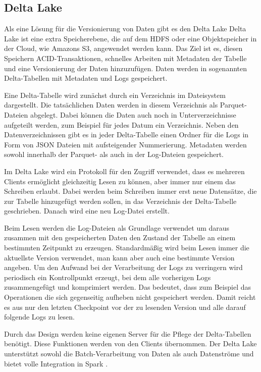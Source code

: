 \subsection{Delta Lake}

Als eine Lösung für die Versionierung von Daten gibt es den Delta Lake
Delta Lake ist eine extra Speicherebene, die auf dem HDFS oder eine Objektspeicher in der Cloud, wie Amazons S3, angewendet werden kann.
Das Ziel ist es, diesen Speichern ACID-Transaktionen, schnelles Arbeiten mit Metadaten der Tabelle und eine Versionierung der Daten hinzuzufügen.
Daten werden in sogenannten Delta-Tabellen mit Metadaten und Logs gespeichert.

Eine Delta-Tabelle wird zunächst durch ein Verzeichnis im Dateisystem dargestellt.
Die tatsächlichen Daten werden in diesem Verzeichnis als Parquet-Dateien abgelegt.
Dabei können die Daten auch noch in Unterverzeichnisse aufgeteilt werden, zum Beispiel für jedes Datum ein Verzeichnis.
Neben den Datenverzeichnissen gibt es in jeder Delta-Tabelle einen Ordner für die Logs in Form von JSON Dateien mit aufsteigender Nummerierung.
Metadaten werden sowohl innerhalb der Parquet- als auch in der Log-Dateien gespeichert.

Im Delta Lake wird ein Protokoll für den Zugriff verwendet, dass es mehreren Clients ermöglicht gleichzeitig Lesen zu können, aber immer nur einem das Schreiben erlaubt.
Dabei werden beim Schreiben immer erst neue Datensätze, die zur Tabelle hinzugefügt werden sollen, in das Verzeichnis der Delta-Tabelle geschrieben.
Danach wird eine neu Log-Datei erstellt.

Beim Lesen werden die Log-Dateien als Grundlage verwendet um daraus zusammen mit den gespeicherten Daten den Zustand der Tabelle an einem bestimmten Zeitpunkt zu erzeugen.
Standardmäßig wird beim Lesen immer die aktuellste Version verwendet, man kann aber auch eine bestimmte Version angeben.
Um den Aufwand bei der Verarbeitung der Logs zu verringern wird periodisch ein Kontrollpunkt erzeugt, bei dem alle vorherigen Logs zusammengefügt und komprimiert werden.
Das bedeutet, dass zum Beispiel das Operationen die sich gegenseitig aufheben nicht gespeichert werden.
Damit reicht es aus nur den letzten Checkpoint vor der zu lesenden Version und alle darauf folgende Logs zu lesen.

Durch das Design werden keine eigenen Server für die Pflege der Delta-Tabellen benötigt.
Diese Funktionen werden von den Clients übernommen.
Der Delta Lake unterstützt sowohl die Batch-Verarbeitung von Daten als auch Datenströme und bietet volle Integration in Spark \parencite{deltalake}.

